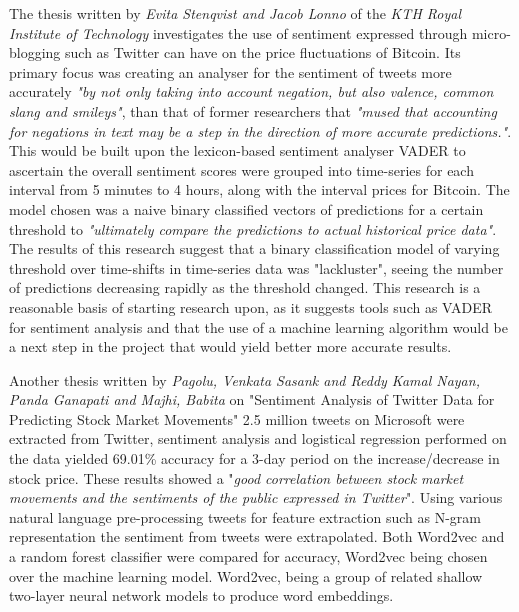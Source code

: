 \documentclass[oneside, 12pt]{article}
\begin{document}
		The thesis written by \textit{Evita Stenqvist and Jacob Lonno} of the \textit{KTH Royal Institute of Technology} \cite{3} investigates the use of sentiment expressed through micro-blogging such as Twitter can have on the price fluctuations of Bitcoin. Its primary focus was creating an analyser for the sentiment of tweets more accurately \textit{"by not only taking into account negation, but also valence, common slang and smileys"}, than that of former researchers that \textit{"mused that accounting for negations in text may be a step in the direction of more accurate predictions."}. This would be built upon the lexicon-based sentiment analyser VADER to ascertain the overall sentiment scores were grouped into time-series for each interval from 5 minutes to 4 hours, along with the interval prices for Bitcoin. The model chosen was a naive binary classified vectors of predictions for a certain threshold to \textit{"ultimately compare the predictions to actual historical price data"}. The results of this research suggest that a binary classification model of varying threshold over time-shifts in time-series data was "lackluster", seeing the number of predictions decreasing rapidly as the threshold changed. This research is a reasonable basis of starting research upon, as it suggests tools such as VADER for sentiment analysis and that the use of a machine learning algorithm would be a next step in the project that would yield better more accurate results.
		
		Another thesis written by \textit{Pagolu, Venkata Sasank and Reddy Kamal Nayan, Panda Ganapati and Majhi, Babita} \cite{1} on "Sentiment Analysis of Twitter Data for Predicting Stock Market Movements" 2.5 million tweets on Microsoft were extracted from Twitter, sentiment analysis and logistical regression performed on the data yielded 69.01\% accuracy for a 3-day period on the increase/decrease in stock price. These results showed a "\textit{good correlation between stock market movements and the sentiments of the public expressed in Twitter}". Using various natural language pre-processing tweets for feature extraction such as N-gram representation the sentiment from tweets were extrapolated. Both Word2vec and a random forest classifier were compared for accuracy, Word2vec being chosen over the machine learning model. Word2vec, being a group of related shallow two-layer neural network models to produce word embeddings.
		
\end{document}
